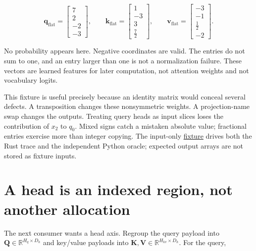 \begin{equation}
\mathbf{q}_{\mathrm{flat}}=
\begin{bmatrix}7\\2\\-2\\-3\end{bmatrix},\qquad
\mathbf{k}_{\mathrm{flat}}=
\begin{bmatrix}1\\-3\\3\\\tfrac72\end{bmatrix},\qquad
\mathbf{v}_{\mathrm{flat}}=
\begin{bmatrix}-3\\-1\\\tfrac12\\-2\end{bmatrix}.
\end{equation}

No probability appears here. Negative coordinates are valid. The entries
do not sum to one, and an entry larger than one is not a normalization
failure. These vectors are learned features for later computation, not
attention weights and not vocabulary logits.

This fixture is useful precisely because an identity matrix would
conceal several defects. A transposition changes these nonsymmetric
weights. A projection-name swap changes the outputs. Treating query
heads as input slices loses the contribution of \(x_2\) to \(q_0\).
Mixed signs catch a mistaken absolute value; fractional entries exercise
more than integer copying. The input-only
\href{https://github.com/hermonai/inside-the-llm-engine/blob/astra-visual-rewrite/code/reference/fixtures/chapter08-qkv.json}{fixture}
drives both the Rust trace and the independent Python oracle; expected
output arrays are not stored as fixture inputs.

\section{A head is an indexed region, not another
allocation}\label{a-head-is-an-indexed-region-not-another-allocation}


The next consumer wants a head axis. Regroup the query payload into
\(\mathbf{Q}\in\mathbb{R}^{H_q\times D_h}\) and key/value payloads into
\(\mathbf{K},\mathbf{V}\in\mathbb{R}^{H_{kv}\times D_h}\). For the
query,

